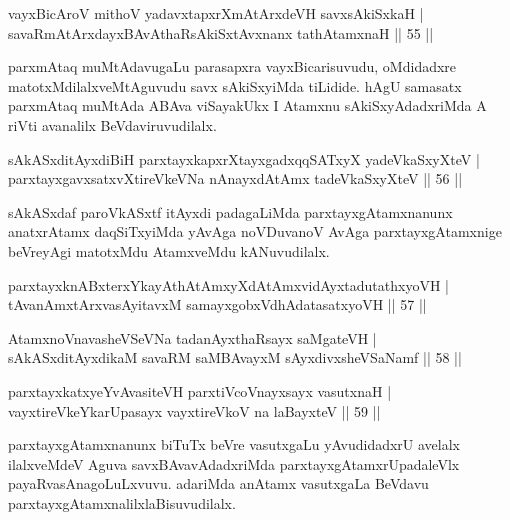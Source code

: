 \begin{shl}
vayxBicAroV mithoV yadavxtapxrXmAtArxdeVH savxsAkiSxkaH |\\
savaRmAtArxdayxBAvAthaRsAkiSxtAvxnanx tathA\s \s tamxnaH \hfill || 55 ||
\end{shl}

\begin{artha}
parxmAtaq muMtAdavugaLu parasapxra vayxBicarisuvudu, oMdidadxre matotxMdilalxveMtAguvudu savx sAkiSxyiMda tiLidide. hAgU samasatx parxmAtaq muMtAda ABAva viSayakUkx I Atamxnu sAkiSxyAdadxriMda A riVti avanalilx BeVdaviruvudilalx.
\end{artha}

\begin{shl}
sAkASxditAyxdiBiH parxtayxkapxrXtayxgadxqqSATxyX yadeVkaSxyXteV |\\
parxtayxgavxsatxvXtireVkeVNa nAnayxdAtAmx tadeVkaSxyXteV \hfill || 56 ||
\end{shl}

\begin{artha}
sAkASxdaf paroVkASxtf itAyxdi padagaLiMda parxtayxgAtamxnanunx anatxrAtamx daqSiTxyiMda yAvAga noVDuvanoV AvAga parxtayxgAtamxnige beVreyAgi matotxMdu AtamxveMdu kANuvudilalx.
\end{artha}

\begin{shl}
parxtayxknABxterxYkayAthAtAmxyXdAtAmxvidAyxtadutathxyoVH |\\
tAvanAmxtArxvasAyitavxM samayxgobxVdhAdatasatxyoVH \hfill || 57 ||
\end{shl}

\begin{shl}
AtamxnoV\s navasheVSeVNa tadanAyxthaRsayx saMgateVH |\\
sAkASxditAyxdikaM savaRM saMBAvayxM sAyxdivxsheVSaNamf \hfill || 58 ||
\end{shl}

\begin{shl}
parxtayxkatxyeYvAvasiteVH parxtiVcoV\s nayxsayx vasutxnaH |\\
vayxtireVkeYkarUpasayx vayxtireVkoV na laBayxteV \hfill || 59 ||
\end{shl}

\begin{artha}%
parxtayxgAtamxnanunx biTuTx beVre vasutxgaLu yAvudidadxrU avelalx ilalxveMdeV Aguva savxBAvavAdadxriMda  parxtayxgAtamxrUpadaleVlx payaRvasAnagoLuLxvuvu. adariMda anAtamx vasutxgaLa BeVdavu parxtayxgAtamxnalilx\break laBisuvudilalx.
\end{artha}

